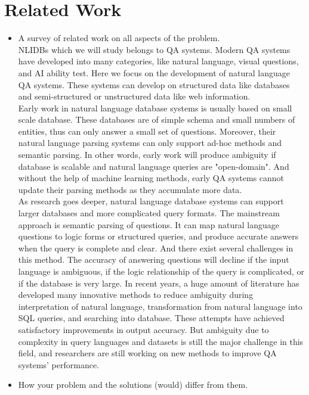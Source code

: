 \documentclass[twocolumn]{article}
\begin{document}
\section{Related Work}


\begin{itemize}
	\itemsep0em
	\item A survey of related work on all aspects of the problem.\\
	
	NLIDBs which we will study belongs to QA systems. Modern QA systems have developed into many categories, like natural language, visual questions, and AI ability test. Here we focus on the development of natural language QA systems. These systems can develop on structured data like databases and semi-structured or unstructured data like web information.\cite{QATutorial}\\
	Early work in natural language database systems is usually based on small scale database. These databases are of simple schema and small numbers of entities, thus can only answer a small set of questions. Moreover, their natural language parsing systems can only support ad-hoc methods and semantic parsing. In other words, early work will produce ambiguity if database is scalable and natural language queries are "open-domain". And without the help of machine learning methods, early QA systems cannot update their parsing methods as they accumulate more data.\\
	As research goes deeper, natural language database systems can support larger databases and more complicated query formats. The mainstream approach is semantic parsing of questions. It can map natural language questions to logic forms or structured queries, and produce accurate answers when the query is complete and clear. And there exist several challenges in this method. The accuracy of answering questions will decline if the input language is ambiguous, if the logic relationship of the query is complicated, or if the database is very large. In recent years, a huge amount of literature has developed many innovative methods to reduce ambiguity during interpretation of natural language, transformation from natural language into SQL queries, and searching into database. These attempts have achieved satisfactory improvements in output accuracy. But ambiguity due to complexity in query languages and datasets is still the major challenge in this field, and researchers are still working on new methods to improve QA systems' performance.\\	
	\item How your problem and the solutions (would) differ from them.\\
	

\end{itemize}
\end{document}
